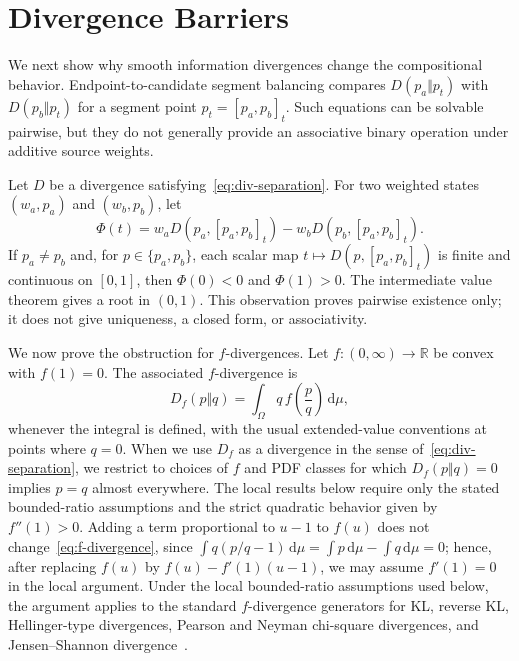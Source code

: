 \documentclass[runningheads]{llncs}
\newcommand{\R}{\mathbb{R}}
\newcommand{\dd}{\,\mathrm{d}}
\begin{document}
\section{Divergence Barriers}\label{sec:divergence}

We next show why smooth information divergences change the compositional behavior. Endpoint-to-candidate segment balancing compares $D(p_a\Vert p_t)$ with $D(p_b\Vert p_t)$ for a segment point $p_t=[p_a,p_b]_t$. Such equations can be solvable pairwise, but they do not generally provide an associative binary operation under additive source weights.

Let $D$ be a divergence satisfying~\eqref{eq:div-separation}. For two weighted states $(w_a,p_a)$ and $(w_b,p_b)$, let
\begin{equation}
  \Phi(t)=w_aD(p_a,[p_a,p_b]_t)-w_bD(p_b,[p_a,p_b]_t).
  \label{eq:phi}
\end{equation}
If $p_a\neq p_b$ and, for $p\in\{p_a,p_b\}$, each scalar map $t\mapsto D(p,[p_a,p_b]_t)$ is finite and continuous on $[0,1]$, then $\Phi(0)<0$ and $\Phi(1)>0$. The intermediate value theorem gives a root in $(0,1)$. This observation proves pairwise existence only; it does not give uniqueness, a closed form, or associativity.

We now prove the obstruction for $f$-divergences. Let $f:(0,\infty)\to\R$ be convex with $f(1)=0$. The associated $f$-divergence is
\begin{equation}
  D_f(p\Vert q)=\int_\Omega q\,f\!\left(\frac{p}{q}\right)\dd\mu,
  \label{eq:f-divergence}
\end{equation}
whenever the integral is defined, with the usual extended-value conventions at points where $q=0$. When we use $D_f$ as a divergence in the sense of~\eqref{eq:div-separation}, we restrict to choices of $f$ and PDF classes for which $D_f(p\Vert q)=0$ implies $p=q$ almost everywhere. The local results below require only the stated bounded-ratio assumptions and the strict quadratic behavior given by $f''(1)>0$. Adding a term proportional to $u-1$ to $f(u)$ does not change~\eqref{eq:f-divergence}, since $\int q(p/q-1)\dd\mu=\int p\dd\mu-\int q\dd\mu=0$; hence, after replacing $f(u)$ by $f(u)-f'(1)(u-1)$, we may assume $f'(1)=0$ in the local argument. Under the local bounded-ratio assumptions used below, the argument applies to the standard $f$-divergence generators for KL, reverse KL, Hellinger-type divergences, Pearson and Neyman chi-square divergences, and Jensen--Shannon divergence~\cite{kullback1951information,ali1966general,csiszar1967information,lin1991divergence}.
\end{document}
